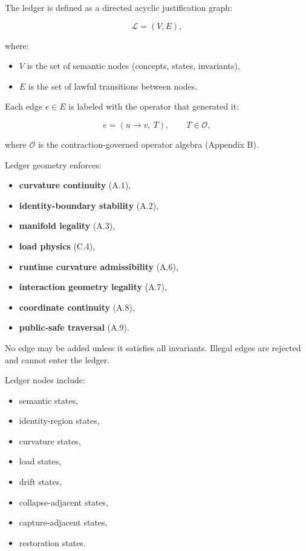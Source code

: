 \medskip

\noindent The ledger is defined as a directed acyclic justification graph:


\[
\mathcal{L} = (V, E),
\]


where:
\begin{itemize}
    \item $V$ is the set of semantic nodes (concepts, states, invariants),
    \item $E$ is the set of lawful transitions between nodes.
\end{itemize}

\medskip

\noindent Each edge $e \in E$ is labeled with the operator that generated it:


\[
e = (u \rightarrow v,\ T),
\qquad T \in \mathcal{O},
\]


where $\mathcal{O}$ is the contraction-governed operator algebra (Appendix B).

\medskip

\noindent Ledger geometry enforces:

\begin{itemize}
    \item \textbf{curvature continuity} (A.1),
    \item \textbf{identity-boundary stability} (A.2),
    \item \textbf{manifold legality} (A.3),
    \item \textbf{load physics} (C.4),
    \item \textbf{runtime curvature admissibility} (A.6),
    \item \textbf{interaction geometry legality} (A.7),
    \item \textbf{coordinate continuity} (A.8),
    \item \textbf{public-safe traversal} (A.9).
\end{itemize}

\medskip

\noindent No edge may be added unless it satisfies all invariants. Illegal edges
are rejected and cannot enter the ledger.

\medskip

\noindent Ledger nodes include:

\begin{itemize}
    \item semantic states,
    \item identity-region states,
    \item curvature states,
    \item load states,
    \item drift states,
    \item collapse-adjacent states,
    \item capture-adjacent states,
    \item restoration states.
\end{itemize}

